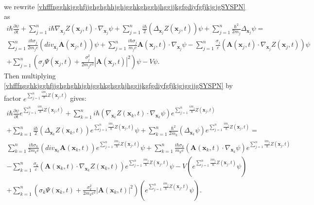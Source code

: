 \documentclass{article}
\theoremstyle{definition}
\theoremstyle{remark}
\renewcommand{\vec}[1]{\mathbf{#1}}
\newcommand{\er}{\eqref}
\newcommand{\er}{\eqref}
\begin{document}
we rewrite
\er{vhfffngghkjgghfjjghghghhjghjgghkghgghjhggjjkgfgdiyfgfjkjgjgSYSPN}
as
\begin{multline}\label{vhfffngghkjgghfjjghghghhjghjgghkghgghjhggjjkgfgdiyfgfjkjgjggjjgSYSPN}
i\hbar\frac{\partial\psi}{\partial
t}+\sum_{j=1}^{n}i\hbar\nabla_{\vec x_j}Z(\vec
x_j,t)\cdot\nabla_{\vec
x_j}\psi+\sum_{j=1}^{n}\frac{i\hbar}{2}\left(\Delta_{\vec x_j}Z(\vec
x_j,t)\right)\psi +\sum_{j=1}^{n}\frac{\hbar^2}{2m_j}\Delta_{\vec
x_j}\psi=\\
\sum_{j=1}^{n}\frac{ i\hbar\sigma_j}{2m_jc}\left(div_{\vec x_j}\vec
A(\vec x_j,t)\right)\psi
+\sum_{j=1}^{n}\frac{ i\hbar\sigma_j}{m_jc}\vec A(\vec
x_j,t)\cdot\nabla_{\vec
x_j}\psi-\sum_{j=1}^{n}\frac{\sigma_j}{c}\left(\vec A(\vec
x_j,t)\cdot\nabla_{\vec x_j}Z(\vec
x_j,t)\right)\psi\\+\sum_{j=1}^{n}\left(\sigma_j\Psi(\vec
x_j,t)+\frac{\sigma^2_j}{2m_jc^2}\left|\vec A(\vec
x_j,t)\right|^2\right)\psi-V\psi.
\end{multline}
Then multiplying
\er{vhfffngghkjgghfjjghghghhjghjgghkghgghjhggjjkgfgdiyfgfjkjgjggjjgSYSPN}
by factor $e^{\sum_{j=1}^{n}\frac{im_j}{\hbar}Z(\vec x_j,t)}$ gives:
\begin{multline}\label{vhfffngghkjgghfjjghghghhjghjgghkghgghjhggjjkgfgdiyfgfjkjgjggjjgugyyjSYSPN}
i\hbar\frac{\partial\psi}{\partial
t}e^{\sum_{j=1}^{n}\frac{im_j}{\hbar}Z(\vec
x_j,t)}+\sum_{k=1}^{n}i\hbar\left(\nabla_{\vec x_k}Z(\vec
x_k,t)\cdot\nabla_{\vec
x_k}\psi\right)e^{\sum_{j=1}^{n}\frac{im_j}{\hbar}Z(\vec
x_j,t)}\\+\sum_{k=1}^{n}\frac{i\hbar}{2}\left(\Delta_{\vec
x_k}Z(\vec x_k,t)\right)e^{\sum_{j=1}^{n}\frac{im_j}{\hbar}Z(\vec
x_j,t)}\psi
 +\sum_{k=1}^{n}\frac{\hbar^2}{2m_k}\left(\Delta_{\vec x_k}\psi\right)e^{\sum_{j=1}^{n}\frac{im_j}{\hbar}Z(\vec x_j,t)}=\\ \sum_{k=1}^{n}\frac{ i\hbar\sigma_k}{2m_kc}\left(div_{\vec x_k}\vec
A(\vec x_k,t)\right)e^{\sum_{j=1}^{n}\frac{im_j}{\hbar}Z(\vec
x_j,t)}\psi +
\sum_{k=1}^{n}\frac{ i\hbar\sigma_k}{m_kc}\left(\vec A(\vec
x_k,t)\cdot\nabla_{\vec
x_k}\psi\right)e^{\sum_{j=1}^{n}\frac{im_j}{\hbar}Z(\vec
x_j,t)}\\-\sum_{k=1}^{n}\frac{\sigma_k}{c}\left(\vec A(\vec
x_k,t)\cdot\nabla_{\vec x_k}Z(\vec
x_k,t)\right)e^{\sum_{j=1}^{n}\frac{im_j}{\hbar}Z(\vec
x_j,t)}\psi-V\left(e^{\sum_{j=1}^{n}\frac{im_j}{\hbar}Z(\vec
x_j,t)}\psi\right)\\+\sum_{k=1}^{n}\left(\sigma_k\Psi(\vec
x_k,t)+\frac{\sigma^2_k}{2m_kc^2}\left|\vec A(\vec
x_k,t)\right|^2\right)\left(e^{\sum_{j=1}^{n}\frac{im_j}{\hbar}Z(\vec
x_j,t)}\psi\right).
\end{multline}
\end{document}
